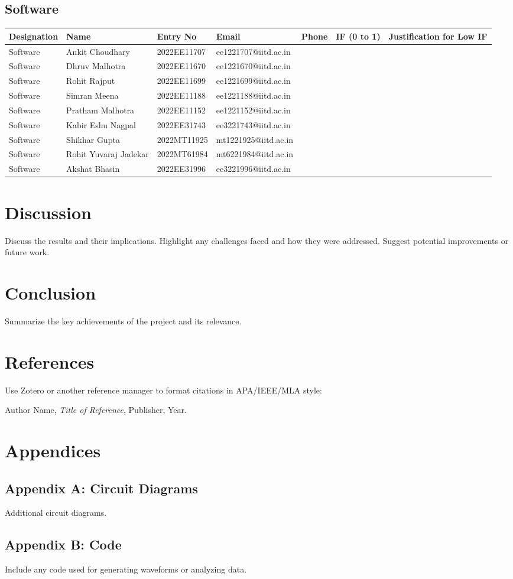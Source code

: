 \documentclass[a4paper,12pt]{article}
\begin{document}
\subsection{Software}
\begin{longtable}[c]{|l|l|l|l|l|l|l|}
\hline
\textbf{Designation} & \textbf{Name} & \textbf{Entry No} & \textbf{Email} & \textbf{Phone} & \textbf{IF (0 to 1)} & \textbf{Justification for Low IF} \\
\hline
Software & Ankit Choudhary & 2022EE11707 & ee1221707@iitd.ac.in &  &  &  \\ \hline
Software & Dhruv Malhotra & 2022EE11670 & ee1221670@iitd.ac.in &  &  &  \\ \hline
Software & Rohit Rajput & 2022EE11699 & ee1221699@iitd.ac.in &  &  &  \\ \hline
Software & Simran Meena & 2022EE11188 & ee1221188@iitd.ac.in &  &  &  \\ \hline
Software & Pratham Malhotra & 2022EE11152 & ee1221152@iitd.ac.in &  &  &  \\ \hline
Software & Kabir Eshu Nagpal & 2022EE31743 & ee3221743@iitd.ac.in &  &  &  \\ \hline
Software & Shikhar Gupta & 2022MT11925 & mt1221925@iitd.ac.in &  &  &  \\ \hline
Software & Rohit Yuvaraj Jadekar & 2022MT61984 & mt6221984@iitd.ac.in &  &  &  \\ \hline
Software & Akshat Bhasin & 2022EE31996 & ee3221996@iitd.ac.in &  &  &  \\ \hline
\end{longtable}


\section{Discussion}
Discuss the results and their implications. Highlight any challenges faced and how they were addressed. Suggest potential improvements or future work.

\section{Conclusion}
Summarize the key achievements of the project and its relevance.

\section{References}
Use Zotero or another reference manager to format citations in APA/IEEE/MLA style:
\begin{thebibliography}{99}
     Author Name, \textit{Title of Reference}, Publisher, Year.
\end{thebibliography}

\appendix
\section{Appendices}
\subsection{Appendix A: Circuit Diagrams}
Additional circuit diagrams.

\subsection{Appendix B: Code}
Include any code used for generating waveforms or analyzing data.
\end{document}

